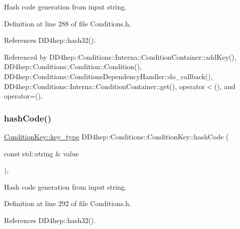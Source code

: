 Hash code generation from input string. 



Definition at line 288 of file Conditions.\+h.



References D\+D4hep\+::hash32().



Referenced by D\+D4hep\+::\+Conditions\+::\+Interna\+::\+Condition\+Container\+::add\+Key(), D\+D4hep\+::\+Conditions\+::\+Condition\+::\+Condition(), D\+D4hep\+::\+Conditions\+::\+Conditions\+Dependency\+Handler\+::do\+\_\+callback(), D\+D4hep\+::\+Conditions\+::\+Interna\+::\+Condition\+Container\+::get(), operator$<$(), and operator=().

\hypertarget{class_d_d4hep_1_1_conditions_1_1_condition_key_a1420df2db54a634af5aa8a033e080c54}{}\label{class_d_d4hep_1_1_conditions_1_1_condition_key_a1420df2db54a634af5aa8a033e080c54} 
\subsubsection{\texorpdfstring{hash\+Code()}{hashCode()}\hspace{0.1cm}{\footnotesize\ttfamily [2/2]}}
{\footnotesize\ttfamily \hyperlink{class_d_d4hep_1_1_conditions_1_1_condition_key_a08bfc8ccb807bdd5e4d9f3b065d1c8f5}{Condition\+Key\+::key\+\_\+type} D\+D4hep\+::\+Conditions\+::\+Condition\+Key\+::hash\+Code (\begin{DoxyParamCaption}\item[{const std\+::string \&}]{value }\end{DoxyParamCaption})\hspace{0.3cm}{\ttfamily [inline]}, {\ttfamily [static]}}



Hash code generation from input string. 



Definition at line 292 of file Conditions.\+h.



References D\+D4hep\+::hash32().

\hypertarget{class_d_d4hep_1_1_conditions_1_1_condition_key_ac799a49354b876f279eb2b72da613d40}{}\label{class_d_d4hep_1_1_conditions_1_1_condition_key_ac799a49354b876f279eb2b72da613d40} 
